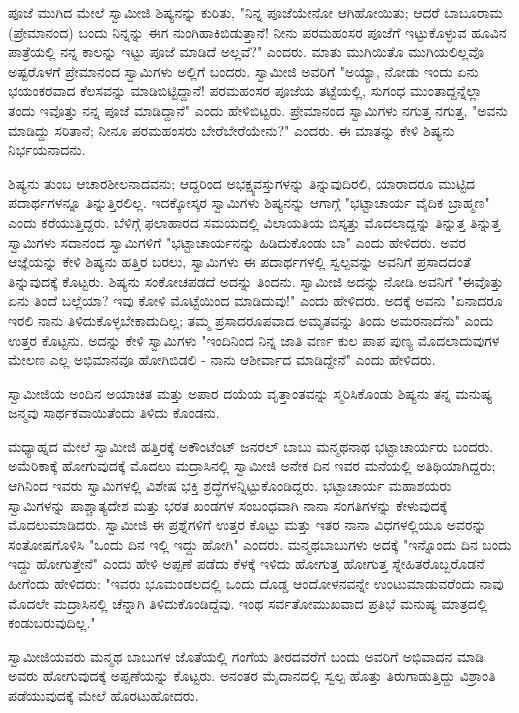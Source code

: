 ಪೂಜೆ ಮುಗಿದ ಮೇಲೆ ಸ್ವಾಮೀಜಿ ಶಿಷ್ಯನನ್ನು ಕುರಿತು, "ನಿನ್ನ ಪೂಜೆಯೇನೋ ಆಗಿಹೋಯಿತು; ಆದರೆ ಬಾಬೂರಾಮ (ಪ್ರೇಮಾನಂದ) ಬಂದು ನಿನ್ನನ್ನು ಈಗ ನುಂಗಿಹಾಕಿಬಿಡುತ್ತಾನೆ! ನೀನು ಪರಮಹಂಸರ ಪೂಜೆಗೆ ಇಟ್ಟುಕೊಳ್ಳುವ ಹೂವಿನ ಪಾತ್ರೆಯಲ್ಲಿ ನನ್ನ ಕಾಲನ್ನು ಇಟ್ಟು ಪೂಜೆ ಮಾಡಿದೆ ಅಲ್ಲವೆ?" ಎಂದರು. ಮಾತು ಮುಗಿಯಿತೊ ಮುಗಿಯಲಿಲ್ಲವೊ ಅಷ್ಟರೊಳಗೆ ಪ್ರೇಮಾನಂದ ಸ್ವಾಮಿಗಳು ಅಲ್ಲಿಗೆ ಬಂದರು. ಸ್ವಾಮೀಜಿ ಅವರಿಗೆ "ಅಯ್ಯಾ, ನೋಡು ಇಂದು ಏನು ಭಯಂಕರವಾದ ಕೆಲಸವನ್ನು ಮಾಡಿಬಿಟ್ಟಿದ್ದಾನೆ! ಪರಮಹಂಸರ ಪೂಜೆಯ ತಟ್ಟೆಯಲ್ಲಿ, ಸುಗಂಧ ಮುಂತಾದ್ದನ್ನೆಲ್ಲಾ ತಂದು ಇವೊತ್ತು ನನ್ನ ಪೂಜೆ ಮಾಡಿದ್ದಾನೆ" ಎಂದು ಹೇಳಿಬಿಟ್ಟರು. ಪ್ರೇಮಾನಂದ ಸ್ವಾಮಿಗಳು ನಗುತ್ತ ನಗುತ್ತ, "ಅವನು ಮಾಡಿದ್ದು ಸರಿತಾನೆ; ನೀನೂ ಪರಮಹಂಸರು ಬೇರೆಬೇರೆಯೇನು?" ಎಂದರು. ಈ ಮಾತನ್ನು ಕೇಳಿ ಶಿಷ್ಯನು ನಿರ್ಭಯನಾದನು.

ಶಿಷ್ಯನು ತುಂಬ ಆಚಾರಶೀಲನಾದವನು; ಆದ್ದರಿಂದ ಅಭಕ್ಷ್ಯವಸ್ತುಗಳನ್ನು ತಿನ್ನುವುದಿರಲಿ, ಯಾರಾದರೂ ಮುಟ್ಟಿದ ಪದಾರ್ಥಗಳನ್ನೂ ತಿನ್ನುತ್ತಿರಲಿಲ್ಲ. ಇದಕ್ಕೋಸ್ಕರ ಸ್ವಾಮಿಗಳು ಶಿಷ್ಯನನ್ನು ಆಗಾಗ್ಗೆ "ಭಟ್ಟಾಚಾರ್ಯ ವೈದಿಕ ಬ್ರಾಹ್ಮಣ" ಎಂದು ಕರೆಯುತ್ತಿದ್ದರು. ಬೆಳಿಗ್ಗೆ ಫಲಾಹಾರದ ಸಮಯದಲ್ಲಿ ವಿಲಾಯತಿಯ ಬಿಸ್ಕತ್ತು ಮೊದಲಾದ್ದನ್ನು ತಿನ್ನುತ್ತ ತಿನ್ನುತ್ತ ಸ್ವಾಮಿಗಳು ಸದಾನಂದ ಸ್ವಾಮಿಗಳಿಗೆ "ಭಟ್ಟಾಚಾರ್ಯನನ್ನು ಹಿಡಿದುಕೊಂಡು ಬಾ" ಎಂದು ಹೇಳಿದರು. ಅವರ ಆಜ್ಞೆಯನ್ನು ಕೇಳಿ ಶಿಷ್ಯನು ಹತ್ತಿರ ಬರಲು, ಸ್ವಾಮಿಗಳು ಈ ಪದಾರ್ಥಗಳಲ್ಲಿ ಸ್ವಲ್ಪವನ್ನು ಅವನಿಗೆ ಪ್ರಸಾದದಂತೆ ತಿನ್ನುವುದಕ್ಕೆ ಕೊಟ್ಟರು. ಶಿಷ್ಯನು ಸಂಕೋಚಪಡದೆ ಅದನ್ನು ತಿಂದನು. ಸ್ವಾಮೀಜಿ ಅದನ್ನು ನೋಡಿ ಅವನಿಗೆ "ಈವೊತ್ತು ಏನು ತಿಂದೆ ಬಲ್ಲೆಯಾ? ಇವು ಕೋಳಿ ಮೊಟ್ಟೆಯಿಂದ ಮಾಡಿದುವು!" ಎಂದು ಹೇಳಿದರು. ಅದಕ್ಕೆ ಅವನು "ಏನಾದರೂ ಇರಲಿ ನಾನು ತಿಳಿದುಕೊಳ್ಳಬೇಕಾದುದಿಲ್ಲ; ತಮ್ಮ ಪ್ರಸಾದರೂಪವಾದ ಅಮೃತವನ್ನು ತಿಂದು ಅಮರನಾದೆನು" ಎಂದು ಉತ್ತರ ಕೊಟ್ಟನು. ಅದನ್ನು ಕೇಳಿ ಸ್ವಾಮಿಗಳು "ಇಂದಿನಿಂದ ನಿನ್ನ ಜಾತಿ ವರ್ಣ ಕುಲ ಪಾಪ ಪುಣ್ಯ ಮೊದಲಾದುವುಗಳ ಮೇಲಣ ಎಲ್ಲ ಅಭಿಮಾನವೂ ಹೋಗಿಬಿಡಲಿ - ನಾನು ಆಶೀರ್ವಾದ ಮಾಡಿದ್ದೇನೆ" ಎಂದು ಹೇಳಿದರು.

ಸ್ವಾಮೀಜಿಯ ಅಂದಿನ ಅಯಾಚಿತ ಮತ್ತು ಅಪಾರ ದಯೆಯ ವೃತ್ತಾಂತವನ್ನು ಸ್ಮರಿಸಿಕೊಂಡು ಶಿಷ್ಯನು ತನ್ನ ಮನುಷ್ಯ ಜನ್ಮವು ಸಾರ್ಥಕವಾಯಿತೆಂದು ತಿಳಿದು ಕೊಂಡನು.

ಮಧ್ಯಾಹ್ನದ ಮೇಲೆ ಸ್ವಾಮೀಜಿ ಹತ್ತಿರಕ್ಕೆ ಅಕೌಂಟೆಂಟ್ ಜನರಲ್ ಬಾಬು ಮನ್ಮಥನಾಥ ಭಟ್ಟಾಚಾರ್ಯರು ಬಂದರು. ಅಮೆರಿಕಾಕ್ಕೆ ಹೋಗುವುದಕ್ಕೆ ಮೊದಲು ಮದ್ರಾಸಿನಲ್ಲಿ ಸ್ವಾಮೀಜಿ ಅನೇಕ ದಿನ ಇವರ ಮನೆಯಲ್ಲಿ ಅತಿಥಿಯಾಗಿದ್ದರು; ಆಗಿನಿಂದ ಇವರು ಸ್ವಾಮಿಗಳಲ್ಲಿ ವಿಶೇಷ ಭಕ್ತಿ ಶ್ರದ್ಧೆಗಳನ್ನಿಟ್ಟುಕೊಂಡಿದ್ದರು. ಭಟ್ಟಾಚಾರ್ಯ ಮಹಾಶಯರು ಸ್ವಾಮಿಗಳನ್ನು ಪಾಶ್ಚಾತ್ಯದೇಶ ಮತ್ತು ಭರತ ಖಂಡಗಳ ಸಂಬಂಧವಾಗಿ ನಾನಾ ಸಂಗತಿಗಳನ್ನು ಕೇಳುವುದಕ್ಕೆ ಮೊದಲುಮಾಡಿದರು. ಸ್ವಾಮೀಜಿ ಈ ಪ್ರಶ್ನೆಗಳಿಗೆ ಉತ್ತರ ಕೊಟ್ಟು ಮತ್ತು ಇತರ ನಾನಾ ವಿಧಗಳಲ್ಲಿಯೂ ಅವರನ್ನು ಸಂತೋಷಗೊಳಿಸಿ "ಒಂದು ದಿನ ಇಲ್ಲಿ ಇದ್ದು ಹೋಗಿ" ಎಂದರು. ಮನ್ಮಥಬಾಬುಗಳು ಅದಕ್ಕೆ "ಇನ್ನೊಂದು ದಿನ ಬಂದು ಇದ್ದು ಹೋಗುತ್ತೇನೆ" ಎಂದು ಹೇಳಿ ಅಪ್ಪಣೆ ಪಡೆದು ಕೆಳಕ್ಕೆ ಇಳಿದು ಹೋಗುತ್ತ ಹೋಗುತ್ತ ಸ್ನೇಹಿತರೊಬ್ಬರೊಡನೆ ಹೀಗೆಂದು ಹೇಳಿದರು: "ಇವರು ಭೂಮಂಡಲದಲ್ಲಿ ಒಂದು ದೊಡ್ಡ ಆಂದೋಳನವನ್ನೇ ಉಂಟುಮಾಡುವರೆಂದು ನಾವು ಮೊದಲೇ ಮದ್ರಾಸಿನಲ್ಲಿ ಚೆನ್ನಾಗಿ ತಿಳಿದುಕೊಂಡಿದ್ದೆವು. ಇಂಥ ಸರ್ವತೋಮುಖವಾದ ಪ್ರತಿಭೆ ಮನುಷ್ಯ ಮಾತ್ರದಲ್ಲಿ ಕಂಡುಬರುವುದಿಲ್ಲ."

ಸ್ವಾಮೀಜಿಯವರು ಮನ್ಮಥ ಬಾಬುಗಳ ಜೊತೆಯಲ್ಲಿ ಗಂಗೆಯ ತೀರದವರೆಗೆ ಬಂದು ಅವರಿಗೆ ಅಭಿವಾದನ ಮಾಡಿ ಅವರು ಹೋಗುವುದಕ್ಕೆ ಅಪ್ಪಣೆಯನ್ನು ಕೊಟ್ಟರು. ಅನಂತರ ಮೈದಾನದಲ್ಲಿ ಸ್ವಲ್ಪ ಹೊತ್ತು ತಿರುಗಾಡುತ್ತಿದ್ದು ವಿಶ್ರಾಂತಿ ಪಡೆಯುವುದಕ್ಕೆ ಮೇಲೆ ಹೊರಟುಹೋದರು.

